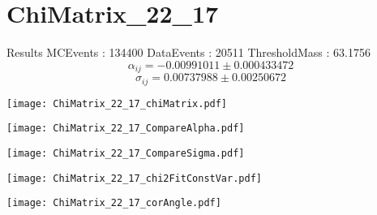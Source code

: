 \documentclass[a4paper,12pt]{article}
\begin{document}
\section{ChiMatrix\_22\_17}
\begin{minipage}{0.49\linewidth} Results \newline
MCEvents : 134400\newline
DataEvents : 20511 \newline
ThresholdMass : 63.1756\\
$$\alpha_{ij} = -0.00991011\pm 0.000433472$$
$$\sigma_{ij} = 0.00737988\pm 0.00250672$$
\end{minipage}\hfill
\begin{minipage}{0.49\linewidth} 
\texttt{[image: ChiMatrix\_22\_17\_chiMatrix.pdf]}\\
\end{minipage}
\hfill
\begin{minipage}{0.49\linewidth} 
\texttt{[image: ChiMatrix\_22\_17\_CompareAlpha.pdf]}\\
\end{minipage}
\hfill
\begin{minipage}{0.49\linewidth} 
\texttt{[image: ChiMatrix\_22\_17\_CompareSigma.pdf]}\\
\end{minipage}
\begin{minipage}{0.49\linewidth} 
\texttt{[image: ChiMatrix\_22\_17\_chi2FitConstVar.pdf]}\\
\end{minipage}
\hfill
\begin{minipage}{0.49\linewidth} 
\texttt{[image: ChiMatrix\_22\_17\_corAngle.pdf]}\\
\end{minipage}
\end{document}

